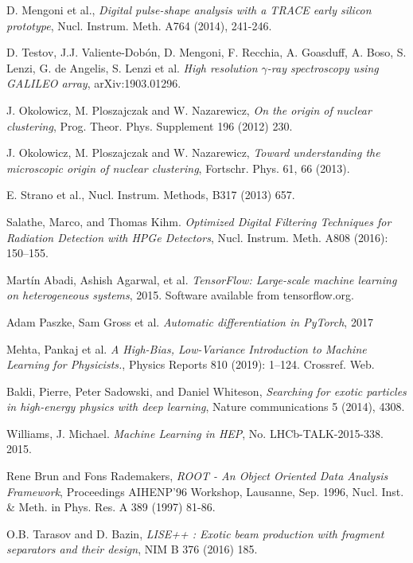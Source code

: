 \begin{thebibliography}{20}

  D. Mengoni et al.,
  \emph{Digital pulse-shape analysis with a TRACE early silicon prototype}, Nucl. Instrum. Meth. A764 (2014), 241-246.

  D. Testov, J.J. Valiente-Dobón, D. Mengoni, F. Recchia, A. Goasduff, A. Boso, S. Lenzi, G. de Angelis, S. Lenzi et al.
  \emph{High resolution $\gamma$-ray spectroscopy using GALILEO array}, arXiv:1903.01296.
  
  J. Okolowicz, M. Ploszajczak and W. Nazarewicz,
  \emph{On the origin of nuclear clustering}, Prog. Theor. Phys. Supplement 196 (2012) 230.

  J. Okolowicz, M. Ploszajczak and W. Nazarewicz,
  \emph{Toward understanding the microscopic origin of nuclear clustering}, Fortschr. Phys. 61, 66 (2013).

  E. Strano et al., Nucl. Instrum. Methods, B317 (2013) 657.
  

Salathe, Marco, and Thomas Kihm. 
\emph{Optimized Digital Filtering Techniques for Radiation Detection with HPGe Detectors}, Nucl. Instrum. Meth. A808 (2016): 150–155.

Martín Abadi, Ashish Agarwal, et al.
\emph{TensorFlow: Large-scale machine learning on heterogeneous systems},
2015. Software available from tensorflow.org.

Adam Paszke, Sam Gross et al.
\emph{Automatic differentiation in PyTorch},
2017

Mehta, Pankaj et al. 
\emph{A High-Bias, Low-Variance Introduction to Machine Learning for Physicists.}, Physics Reports 810 (2019): 1–124. Crossref. Web.

Baldi, Pierre, Peter Sadowski, and Daniel Whiteson, \emph{Searching for exotic particles in high-energy physics with deep learning}, Nature communications 5 (2014), 4308.

  Williams, J. Michael. \emph{Machine Learning in HEP}, No. LHCb-TALK-2015-338. 2015.

  Rene Brun and Fons Rademakers,
  \emph{ROOT - An Object Oriented Data Analysis Framework}, Proceedings AIHENP'96 Workshop, Lausanne, Sep. 1996, Nucl. Inst. \& Meth. in Phys. Res. A 389 (1997) 81-86.

  O.B. Tarasov and D. Bazin,
  \emph{LISE++ : Exotic beam production with fragment separators and their design}, NIM B 376 (2016) 185.


\end{thebibliography}
